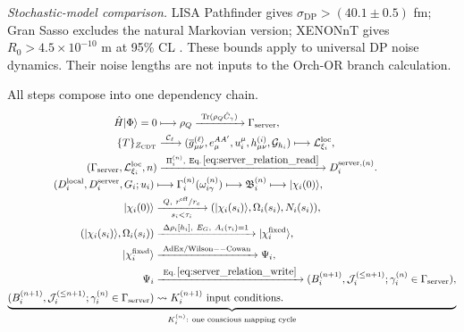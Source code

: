 \noindent\begin{minipage}{\linewidth}
\noindent\textit{Stochastic-model comparison.}
LISA Pathfinder gives $\sigma_{\mathrm{DP}}>(40.1\pm0.5)$ fm; Gran Sasso excludes
the natural Markovian version; XENONnT gives $R_0>4.5\times10^{-10}$ m at 95\% CL
\citep{helou2017,donadi2021,xenon2026collapse}. These bounds apply to universal DP
noise dynamics. Their noise lengths are not inputs to the Orch-OR branch calculation.
\end{minipage}

All steps compose into one dependency chain.
\begin{equation}
  \begin{gathered}
  \begin{aligned}
  \hat H|\Phi\rangle=0
  &\longmapsto \rho_Q
  \xrightarrow{\ \operatorname{Tr}(\rho_Q\hat C_\gamma)\ }
  \Gamma_{\mathrm{server}},\\
  \{T\}_{Z_{\mathrm{CDT}}}
  &\xrightarrow{\ \mathcal C_\ell\ }
  (\overline g_{\mu\nu}^{(\ell)},e_\mu^{AA'},u_i^\mu,
   h_{\mu\nu}^{(i)},\mathcal G_{h_i})
  \longmapsto \mathcal L_{\xi_i}^{\mathrm{loc}},\\
  (\Gamma_{\mathrm{server}},\mathcal L_{\xi_i}^{\mathrm{loc}},n)
  &\xrightarrow{\ \Pi_i^{(n)},\ \mathrm{Eq.}\,\eqref{eq:server_relation_read}\ }
  D_i^{\mathrm{server},(n)}.
  \end{aligned}\\[-2pt]
  \underbrace{\begin{aligned}
  (D_i^{\mathrm{local}},D_i^{\mathrm{server}},G_i;u_i)
  &\longmapsto \Gamma_i^{(n)}(\omega_{i\gamma}^{(n)})
  \longmapsto \mathfrak B_i^{(n)}
  \longmapsto |\chi_i(0)\rangle,\\
  |\chi_i(0)\rangle
  &\xrightarrow[\ s_i<\tau_i\ ]{\ Q,\ r^{\mathrm{eff}}/r_c\ }
  (|\chi_i(s_i)\rangle,\Omega_i(s_i),N_i(s_i)),\\
  (|\chi_i(s_i)\rangle,\Omega_i(s_i))
  &\xrightarrow{\ \Delta\rho_i[h_i],\ E_G,\ A_i(\tau_i)=1\ }
  |\chi_i^{\mathrm{fixed}}\rangle,\\
  |\chi_i^{\mathrm{fixed}}\rangle
  &\xrightarrow{\ \mathrm{AdEx/Wilson--Cowan}\ }\Psi_i,\\
  \Psi_i
  &\xrightarrow{\ \mathrm{Eq.}\,\eqref{eq:server_relation_write}\ }
  (B_i^{(n+1)},\mathcal J_i^{(\leq n+1)};
   \gamma_i^{(n)}\in\Gamma_{\mathrm{server}}),\\
  (B_i^{(n+1)},\mathcal J_i^{(\leq n+1)};
   \gamma_i^{(n)}\in\Gamma_{\mathrm{server}})
  &\rightsquigarrow K_i^{(n+1)}\text{ input conditions}.
  \end{aligned}}_{K_i^{(n)}\text{: one conscious mapping cycle}}
  \end{gathered}
  \label{eq:physical_chain}
\end{equation}

